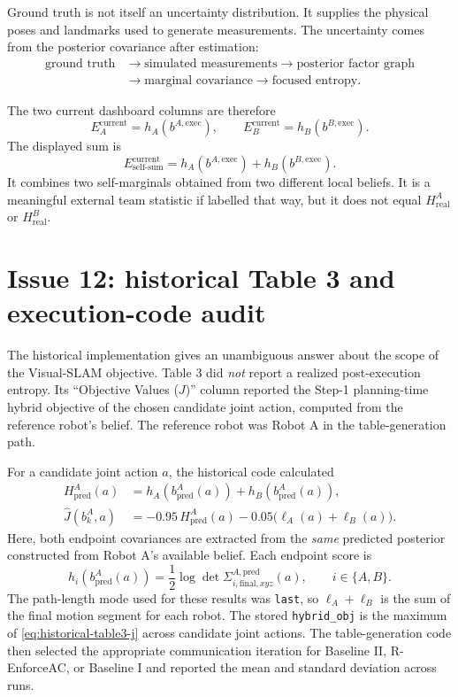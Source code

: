 \documentclass[11pt,a4paper]{article}
\newcommand{\hpose}[2]{h_{#1}\!\left(b^{#2}\right)}
\begin{document}
Ground truth is not itself an uncertainty distribution.  It supplies the
physical poses and landmarks used to generate measurements.  The uncertainty
comes from the posterior covariance after estimation:
\[
  \begin{aligned}
  \text{ground truth}
  &\longrightarrow \text{simulated measurements}
  \longrightarrow \text{posterior factor graph}\\
  &\longrightarrow \text{marginal covariance}
  \longrightarrow \text{focused entropy}.
  \end{aligned}
\]

The two current dashboard columns are therefore
\[
  E_A^{\mathrm{current}}=\hpose{A}{A,\mathrm{exec}},
  \qquad
  E_B^{\mathrm{current}}=\hpose{B}{B,\mathrm{exec}}.
\]
The displayed sum is
\[
  E_{\mathrm{self\mbox{-}sum}}^{\mathrm{current}}
  =\hpose{A}{A,\mathrm{exec}}+\hpose{B}{B,\mathrm{exec}}.
\]
It combines two self-marginals obtained from two different local beliefs.  It
is a meaningful external team statistic if labelled that way, but it does not
equal $H_{\mathrm{real}}^A$ or $H_{\mathrm{real}}^B$.

\section{Issue 12: historical Table 3 and execution-code audit}

The historical implementation gives an unambiguous answer about the scope of
the Visual-SLAM objective.  Table 3 did \emph{not} report a realized
post-execution entropy.  Its ``Objective Values ($J$)'' column reported the
Step-1 planning-time hybrid objective of the chosen candidate joint action,
computed from the reference robot's belief.  The reference robot was Robot A
in the table-generation path.

For a candidate joint action $a$, the historical code calculated
\begin{align}
 H_{\mathrm{pred}}^A(a)
 &=h_A\!\left(b_{\mathrm{pred}}^A(a)\right)
   +h_B\!\left(b_{\mathrm{pred}}^A(a)\right), \\
 \widehat J\!\left(b_k^A,a\right)
 &=-0.95\,H_{\mathrm{pred}}^A(a)
   -0.05\bigl(\ell_A(a)+\ell_B(a)\bigr).
 \label{eq:historical-table3-j}
\end{align}
Here, both endpoint covariances are extracted from the \emph{same} predicted
posterior constructed from Robot A's available belief.  Each endpoint score is
\begin{equation}
 h_i\!\left(b_{\mathrm{pred}}^A(a)\right)
 =\frac{1}{2}\log\det
   \Sigma^{A,\mathrm{pred}}_{i,\mathrm{final},xyz}(a),
 \qquad i\in\{A,B\}.
\end{equation}
The path-length mode used for these results was \texttt{last}, so
$\ell_A+\ell_B$ is the sum of the final motion segment for each robot.  The
stored \texttt{hybrid\_obj} is the maximum of
\eqref{eq:historical-table3-j} across candidate joint actions.  The
table-generation code then selected the appropriate communication iteration
for Baseline II, R-EnforceAC, or Baseline I and reported the mean and standard
deviation across runs.
\end{document}
